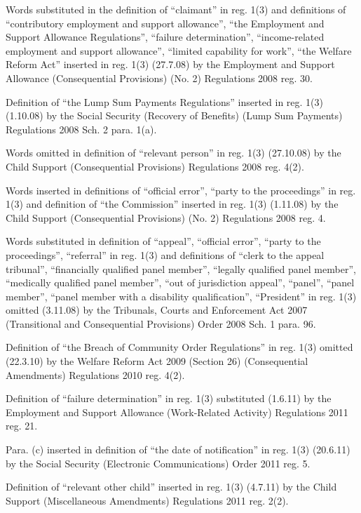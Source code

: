 \documentclass[12pt,a4paper]{article}
\begin{document}
{Words substituted in the definition of ``claimant'' in reg. 1(3) and definitions of ``contributory employment and support allowance'', ``the Employment and Support Allowance Regulations'', ``failure determination'', ``income-related employment and support allowance'', ``limited capability for work'', ``the Welfare Reform Act'' inserted in reg. 1(3) (27.7.08) by the Employment and Support Allowance (Consequential Provisions) (No. 2) Regulations 2008 reg. 30.

Definition of ``the Lump Sum Payments Regulations'' inserted in reg. 1(3) (1.10.08) by the Social Security (Recovery of Benefits) (Lump Sum Payments) Regulations 2008 Sch. 2 para. 1(a).

Words omitted in definition of ``relevant person'' in reg. 1(3) (27.10.08) by the Child Support (Consequential Provisions) Regulations 2008 reg. 4(2).

Words inserted in definitions of ``official error'', ``party to the proceedings'' in reg. 1(3) and definition of ``the Commission'' inserted in reg. 1(3) (1.11.08) by the Child Support (Consequential Provisions) (No. 2) Regulations 2008 reg. 4.

Words substituted in definition of ``appeal'', ``official error'', ``party to the proceedings'', ``referral'' in reg. 1(3) and definitions of ``clerk to the appeal tribunal'', ``financially qualified panel member'', ``legally qualified panel member'', ``medically qualified panel member'', ``out of jurisdiction appeal'', ``panel'', ``panel member'', ``panel member with a disability qualification'', ``President'' in reg. 1(3) omitted (3.11.08) by the Tribunals, Courts and Enforcement Act 2007 (Transitional and Consequential Provisions) Order 2008 Sch. 1 para. 96.

Definition of ``the Breach of Community Order Regulations'' in reg. 1(3) omitted (22.3.10) by the Welfare Reform Act 2009 (Section 26) (Consequential Amendments) Regulations 2010 reg. 4(2).

Definition of ``failure determination'' in reg. 1(3) substituted (1.6.11) by the Employment and Support Allowance (Work-Related Activity) Regulations 2011 reg. 21.

Para. (c) inserted in definition of ``the date of notification'' in reg. 1(3) (20.6.11) by the Social Security (Electronic Communications) Order 2011 reg. 5.

Definition of ``relevant other child'' inserted in reg. 1(3) (4.7.11) by the Child Support (Miscellaneous Amendments) Regulations 2011 reg. 2(2).

}
\end{document}
